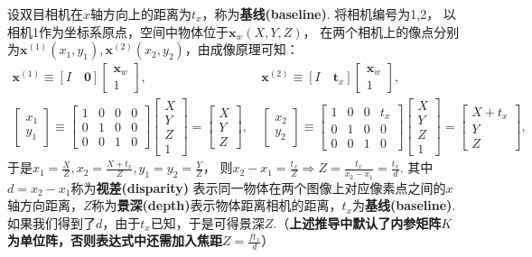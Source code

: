 \documentclass[12pt, a4paper, oneside]{ctexart}
\numberwithin{equation}{section}  %
\theoremstyle{definition}
\def\bd{\boldsymbol}        %
\def\Z{\mathbb{Z}}          %
\def\add{\vspace{1ex}}      %
\def\del{\vspace{-1.5ex}}   %
\begin{document}
设双目相机在$x$轴方向上的距离为$t_x$，称为\textbf{基线(baseline)}. 将相机编号为1,2，
以相机1作为坐标系原点，空间中物体位于$\bd{x}_w(X,Y,Z)$，
在两个相机上的像点分别为$\bd{x}^{(1)}(x_1,y_1),\bd{x}^{(2)}(x_2,y_2)$，由成像原理可知：\del\del
\begin{align}
    \label{eq-双目相机}\bd{x}^{(1)}\equiv [I\quad \bd{0}]\left[\begin{matrix}
        \bd{x}_w\\ 1
    \end{matrix}\right],&\ 
    \bd{x}^{(2)}\equiv [I\quad \bd{t}_x]\left[\begin{matrix}
        \bd{x}_w\\ 1
    \end{matrix}\right],
    \\
    \nonumber\begin{bmatrix}
        x_1\\y_1
    \end{bmatrix}\equiv \begin{bmatrix}
        1&0&0&0\\
        0&1&0&0\\
        0&0&1&0
    \end{bmatrix}\begin{bmatrix}
        X\\Y\\Z\\1
    \end{bmatrix} = \begin{bmatrix}
        X\\Y\\Z
    \end{bmatrix},&\ 
    \begin{bmatrix}
        x_2\\y_2
    \end{bmatrix}\equiv \begin{bmatrix}
        1&0&0&t_x\\
        0&1&0&0\\
        0&0&1&0
    \end{bmatrix}\begin{bmatrix}
        X\\Y\\Z\\1
    \end{bmatrix} = \begin{bmatrix}
        X+t_x\\Y\\Z
    \end{bmatrix},\ 
\end{align}
于是$x_1 = \frac{X}{Z}, x_2 = \frac{X+t_x}{Z}, y_1=y_2=\frac{Y}{Z}$，
则$x_2-x_1 = \frac{t_x}{Z}\Rightarrow Z = \frac{t_x}{x_2-x_1}=\frac{t_x}{d}$.\add
其中$d=x_2-x_1$称为\textbf{视差(disparity)}
表示同一物体在两个图像上对应像素点之间的$x$轴方向距离，$Z$称为\textbf{景深(depth)}表示物体距离相机的距离，$t_x$为\textbf{基线(baseline)}.
如果我们得到了$d$，\add 由于$t_x$已知，于是可得景深$Z$.（\textbf{上述推导中默认了内参矩阵$K$为单位阵，否则表达式中还需加入焦距$Z = \frac{ft_x}{d}$}）
\end{document}
